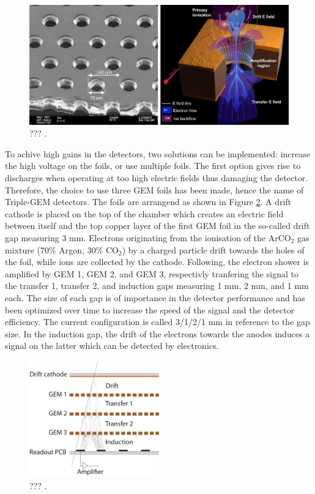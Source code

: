     \begin{figure}[h!]
      \centering
      \includegraphics[width=\textwidth]{img/II-1-gem/holes.pdf}
      \caption{??? \cite{Colaleo:2021453}.}
      \label{fig:II-1-gem-holes}
    \end{figure}

    To achive high gains in the detectors, two solutions can be implemented: increase the high voltage on the foils, or use multiple foils. The first option gives rise to discharges when operating at too high electric fields thus damaging the detector. Therefore, the choice to use three GEM foils has been made, hence the name of Triple-GEM detectors. The foils are arrangend as shown in Figure \ref{fig:II-1-gem-triple}. A drift cathode is placed on the top of the chamber which creates an electric field between itself and the top copper layer of the first GEM foil in the so-called drift gap measuring 3 mm. Electrons originating from the ionisation of the ArCO$_2$ gas mixture (70\% Argon, 30\% CO$_2$) by a charged particle drift towards the holes of the foil, while ions are collected by the cathode. Following, the electron shower is amplified by GEM 1, GEM 2, and GEM 3, respectivly tranfering the signal to the transfer 1, transfer 2, and induction gaps measuring 1 mm, 2 mm, and 1 mm each. The size of each gap is of importance in the detector performance and has been optimized over time to increase the speed of the signal and the detector efficiency. The current configuration is called 3/1/2/1 mm in reference to the gap size. In the induction gap, the drift of the electrons towards the anodes induces a signal on the latter which can be detected by electronics. \\

    \begin{figure}[h!]
      \centering
      \includegraphics[width=0.5\textwidth]{img/II-1-gem/triple-gem-foils.pdf}
      \caption{??? \cite{Colaleo:2021453}.}
      \label{fig:II-1-gem-triple}
    \end{figure}

